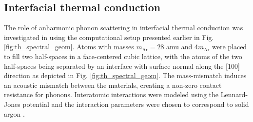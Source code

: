 \subsection{Interfacial thermal conduction}
\label{sec:results_interface}

The role of anharmonic phonon scattering in interfacial thermal conduction was investigated in  using the computational setup presented earlier in Fig. \ref{fig:th_spectral_geom}. Atoms with masses $m_{\textrm{Ar}}=28$ amu and $4m_{\textrm{Ar}}$ were placed to fill two half-spaces in a face-centered cubic lattice, with the atoms of the two half-spaces being separated by an interface with surface normal along the [100] direction as depicted in Fig. \ref{fig:th_spectral_geom}. The mass-mismatch induces an acoustic mismatch between the materials, creating a non-zero contact resistance for phonons. Interatomic interactions were modeled using the Lennard-Jones potential \cite{allentildesley} and the interaction parameters were chosen to correspond to solid argon \cite{allentildesley}. 

